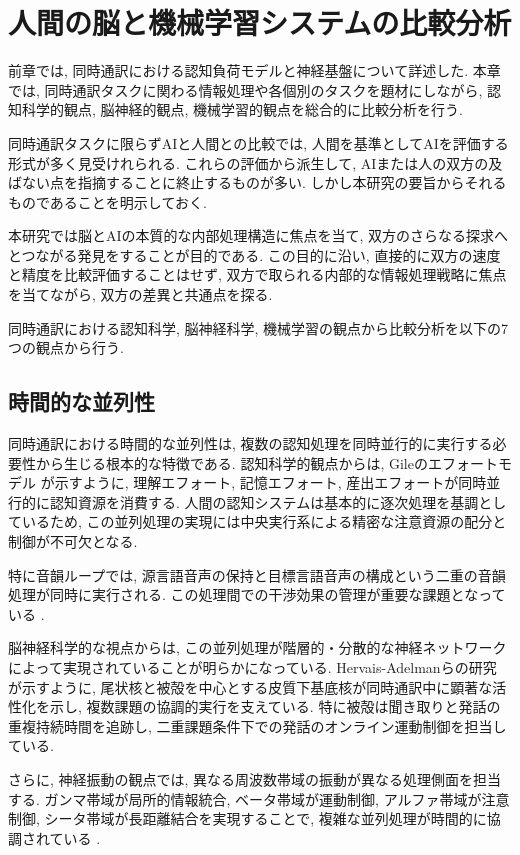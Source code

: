 \section{人間の脳と機械学習システムの比較分析}

前章では, 同時通訳における認知負荷モデルと神経基盤について詳述した.
本章では, 同時通訳タスクに関わる情報処理や各個別のタスクを題材にしながら, 認知科学的観点, 脳神経的観点, 機械学習的観点を総合的に比較分析を行う. 

同時通訳タスクに限らずAIと人間との比較では, 人間を基準としてAIを評価する形式が多く見受けれられる.
これらの評価から派生して, AIまたは人の双方の及ばない点を指摘することに終止するものが多い.
しかし本研究の要旨からそれるものであることを明示しておく.

本研究では脳とAIの本質的な内部処理構造に焦点を当て, 双方のさらなる探求へとつながる発見をすることが目的である.
この目的に沿い, 直接的に双方の速度と精度を比較評価することはせず, 双方で取られる内部的な情報処理戦略に焦点を当てながら, 双方の差異と共通点を探る.

同時通訳における認知科学, 脳神経科学, 機械学習の観点から比較分析を以下の7つの観点から行う.

\subsection{時間的な並列性}

同時通訳における時間的な並列性は, 複数の認知処理を同時並行的に実行する必要性から生じる根本的な特徴である.
認知科学的観点からは, Gileのエフォートモデル \cite{gile1995basic} が示すように, 理解エフォート, 記憶エフォート, 産出エフォートが同時並行的に認知資源を消費する.
人間の認知システムは基本的に逐次処理を基調としているため, この並列処理の実現には中央実行系による精密な注意資源の配分と制御が不可欠となる.

特に音韻ループでは, 源言語音声の保持と目標言語音声の構成という二重の音韻処理が同時に実行される.
この処理間での干渉効果の管理が重要な課題となっている \cite{christoffels2006cognitive}.

脳神経科学的な視点からは, この並列処理が階層的・分散的な神経ネットワークによって実現されていることが明らかになっている.
Hervais-Adelmanらの研究 \cite{hervais2015fmri} が示すように, 尾状核と被殻を中心とする皮質下基底核が同時通訳中に顕著な活性化を示し, 複数課題の協調的実行を支えている.
特に被殻は聞き取りと発話の重複持続時間を追跡し, 二重課題条件下での発話のオンライン運動制御を担当している.

さらに, 神経振動の観点では, 異なる周波数帯域の振動が異なる処理側面を担当する.
ガンマ帯域が局所的情報統合, ベータ帯域が運動制御, アルファ帯域が注意制御, シータ帯域が長距離結合を実現することで, 複雑な並列処理が時間的に協調されている \cite{elmer2016functional}.

